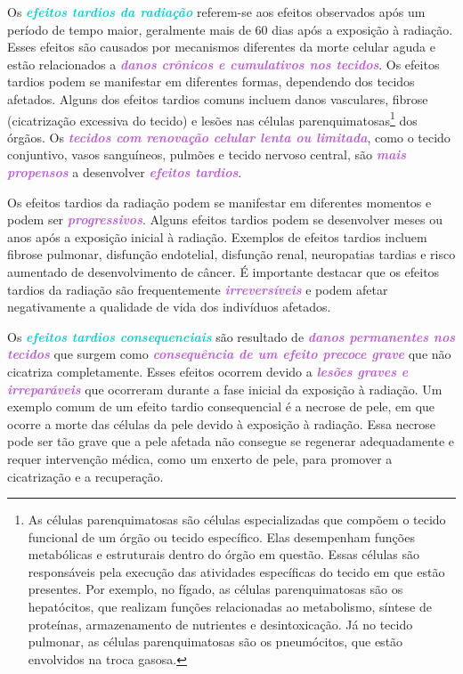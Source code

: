 \documentclass[11pt,a4paper]{article}
\newcounter{exemplo}
\begin{document}
	Os \textcolor{DarkTurquoise}{\textbf{\textit{efeitos tardios da radiação}}} referem-se aos efeitos observados após um período de tempo maior, geralmente mais de 60 dias após a exposição à radiação. Esses efeitos são causados por mecanismos diferentes da morte celular aguda e estão relacionados a \textcolor{MediumOrchid}{\textbf{\textit{danos crônicos e cumulativos nos tecidos}}}. Os efeitos tardios podem se manifestar em diferentes formas, dependendo dos tecidos afetados. Alguns dos efeitos tardios comuns incluem danos vasculares, fibrose (cicatrização excessiva do tecido) e lesões nas células parenquimatosas\footnote{As células parenquimatosas são células especializadas que compõem o tecido funcional de um órgão ou tecido específico. Elas desempenham funções metabólicas e estruturais dentro do órgão em questão. Essas células são responsáveis pela execução das atividades específicas do tecido em que estão presentes. Por exemplo, no fígado, as células parenquimatosas são os hepatócitos, que realizam funções relacionadas ao metabolismo, síntese de proteínas, armazenamento de nutrientes e desintoxicação. Já no tecido pulmonar, as células parenquimatosas são os pneumócitos, que estão envolvidos na troca gasosa.} dos órgãos.
	Os \textcolor{MediumOrchid}{\textbf{\textit{tecidos com renovação celular lenta ou limitada}}}, como o tecido conjuntivo, vasos sanguíneos, pulmões e tecido nervoso central, são \textcolor{MediumOrchid}{\textbf{\textit{mais propensos}}} a desenvolver \textcolor{MediumOrchid}{\textbf{\textit{efeitos tardios}}}.
	
	Os efeitos tardios da radiação podem se manifestar em diferentes momentos e podem ser \textcolor{MediumOrchid}{\textbf{\textit{progressivos}}}. Alguns efeitos tardios podem se desenvolver meses ou anos após a exposição inicial à radiação. Exemplos de efeitos tardios incluem fibrose pulmonar, disfunção endotelial, disfunção renal, neuropatias tardias e risco aumentado de desenvolvimento de câncer.	É importante destacar que os efeitos tardios da radiação são frequentemente \textcolor{MediumOrchid}{\textbf{\textit{irreversíveis}}} e podem afetar negativamente a qualidade de vida dos indivíduos afetados.

	Os \textcolor{DarkTurquoise}{\textbf{\textit{efeitos tardios consequenciais}}} são resultado de \textcolor{MediumOrchid}{\textbf{\textit{danos permanentes nos tecidos}}} que surgem como \textcolor{MediumOrchid}{\textbf{\textit{consequência de um efeito precoce grave}}} que não cicatriza completamente. Esses efeitos ocorrem devido a \textcolor{MediumOrchid}{\textbf{\textit{lesões graves e irreparáveis}}} que ocorreram durante a fase inicial da exposição à radiação. Um exemplo comum de um efeito tardio consequencial é a necrose de pele, em que ocorre a morte das células da pele devido à exposição à radiação. Essa necrose pode ser tão grave que a pele afetada não consegue se regenerar adequadamente e requer intervenção médica, como um enxerto de pele, para promover a cicatrização e a recuperação.
\end{document}
